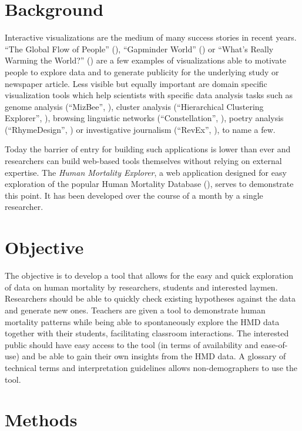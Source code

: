 \documentclass[
  12pt
]{scrartcl}
\begin{document}
\section*{Background}

Interactive visualizations are the medium of many success stories in recent years. \enquote{The Global Flow of People} (\cite{Sander2014}), \enquote{Gapminder World} (\cite{Rosling2006}) or \enquote{What's Really Warming the World?} (\cite{Roston2015}) are a few examples of visualizations able to motivate people to explore data and to generate publicity for the underlying study or newspaper article. Less visible but equally important are domain specific visualization tools which help scientists with specific data analysis tasks such as genome analysis (\enquote{MizBee}, \cite{Meyer2009}), cluster analysis (\enquote{Hierarchical Clustering Explorer}, \cite{Seo2002}), browsing linguistic networks (\enquote{Constellation}, \cite{Munzner1999}), poetry analysis (\enquote{RhymeDesign}, \cite{McCurdy2015}) or investigative journalism (\enquote{RevEx}, \cite{Bertini2015}), to name a few.

Today the barrier of entry for building such applications is lower than ever and researchers can build web-based tools themselves without relying on external expertise. The \emph{Human Mortality Explorer}, a web application designed for easy exploration of the popular Human Mortality Database (\cite{Hmd2015}), serves to demonstrate this point. It has been developed over the course of a month by a single researcher.

\section*{Objective}

The objective is to develop a tool that allows for the easy and quick exploration of data on human mortality by researchers, students and interested laymen. Researchers should be able to quickly check existing hypotheses against the data and generate new ones. Teachers are given a tool to demonstrate human mortality patterns while being able to spontaneously explore the HMD data together with their students, facilitating classroom interactions. The interested public should have easy access to the tool (in terms of availability and ease-of-use) and be able to gain their own insights from the HMD data. A glossary of technical terms and interpretation guidelines allows non-demographers to use the tool.

\section*{Methods}
\end{document}
